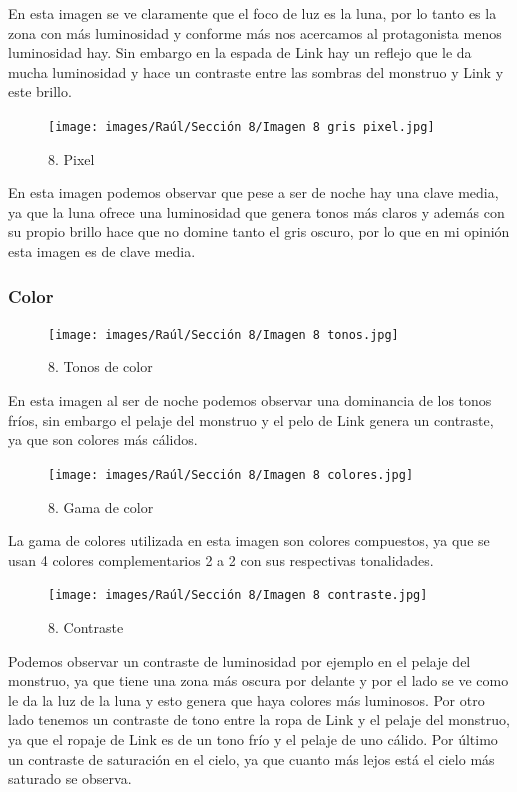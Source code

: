 \documentclass[12pt]{article}
\begin{document}
 En esta imagen se ve claramente que el foco de luz es la luna, por lo tanto es la zona con más luminosidad y conforme más nos acercamos al protagonista menos luminosidad hay. Sin embargo en la espada de Link hay un reflejo que le da mucha luminosidad y hace un contraste entre las sombras del monstruo y Link y este brillo.

\begin{figure}[H]
      \centering
      \texttt{[image: images/Raúl/Sección 8/Imagen 8 gris pixel.jpg]}
      \caption{\small 8. Pixel}
    \end{figure}

 En esta imagen podemos observar que pese a ser de noche hay una clave media, ya que la luna ofrece una luminosidad que genera tonos más claros y además con su propio brillo hace que no domine tanto el gris oscuro, por lo que en mi opinión esta imagen es de clave media.

        \subsubsection{Color}

\begin{figure}[H]
      \centering
      \texttt{[image: images/Raúl/Sección 8/Imagen 8 tonos.jpg]}
      \caption{\small 8. Tonos de color}
    \end{figure}

En esta imagen al ser de noche podemos observar una dominancia de los tonos fríos, sin embargo el pelaje del monstruo y el pelo de Link genera un contraste, ya que son colores más cálidos.

\begin{figure}[H]
      \centering
      \texttt{[image: images/Raúl/Sección 8/Imagen 8 colores.jpg]}
      \caption{\small 8. Gama de color}
    \end{figure}

 La gama de colores utilizada en esta imagen son colores compuestos, ya que se usan 4 colores complementarios 2 a 2 con sus respectivas tonalidades.

\begin{figure}[H]
      \centering
      \texttt{[image: images/Raúl/Sección 8/Imagen 8 contraste.jpg]}
      \caption{\small 8. Contraste}
    \end{figure}

Podemos observar un contraste de luminosidad por ejemplo en el pelaje del monstruo, ya que tiene una zona más oscura por delante y por el lado se ve como le da la luz de la luna y esto genera que haya colores más luminosos. Por otro lado tenemos un contraste de tono entre la ropa de Link y el pelaje del monstruo, ya que el ropaje de Link es de un tono frío y el pelaje de uno cálido. Por último un contraste de saturación en el cielo, ya que cuanto más lejos está el cielo más saturado se observa.
\end{document}
